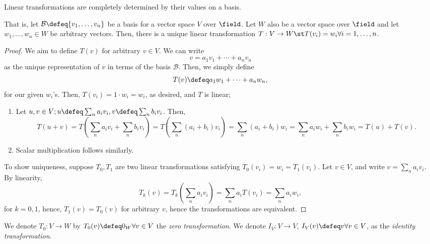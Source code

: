 \begin{theorem}\label{thm:basisdeteremineslineartransformation}
    Linear transformations are completely determined by their values on a basis. 
    
    That is, let $\mathcal{B} \defeq \{v_1, \dots, v_n\}$ be a basis for a vector space $V$ over $\field$. Let $W$ also be a vector space over $\field$ and let $w_1, \dots, w_n \in W$ be arbitrary vectors. Then, there is a unique linear transformation $T : V \to W \st T(v_i) = w_i \forall i = 1, \dots, n$.
\end{theorem}

\begin{proof}
    We aim to define $T(v)$ for arbitrary $v \in V$. We can write \[
    v = a_1 v_1 + \cdots + a_n v_n    
    \]
    as the unique representation of $v$ in terms of the basis $\mathcal{B}$. Then, we simply define \[
        T(v) \defeq a_1 w_1 + \cdots + a_n w_n,
    \]
    for our given $w_i$'s. Then, $T(v_i) = 1 \cdot w_i = w_i$, as desired, and $T$ is linear; \begin{enumerate}
        \item Let $u, v \in V; u \defeq \sum_{n} a_i v_i, v\defeq \sum_{n} b_i v_i$. Then, \[
        T(u + v) = T(\sum_{n} a_i v_i+\sum_{n} b_i v_i) = T(\sum_n(a_i + b_i) v_i)   =\sum_n (a_i + b_i) w_i =  \sum_{n} a_i w_i + \sum_{n} b_i w_i = T(u) + T(v).
        \]
        \item Scalar multiplication follows similarly.
    \end{enumerate}

    To show uniqueness, suppose $T_0, T_1$ are two linear transformations satisfying $T_0(v_i) = w_i = T_1(v_i)$. Let $v \in V$, and write $v = \sum_{n} a_i v_i$. By linearity, \[
    T_k (v) = T_k(\sum_n a_i v_i) = \sum_n a_i T(v_i) = \sum_n a_i w_i,    
    \]
    for $k = 0, 1$, hence, $T_1(v) = T_0(v)$ for arbitrary $v$, hence the transformations are equivalent.
\end{proof}

\begin{definition}
    We denote $T_0: V \to W$ by $T_0(v) \defeq 0_W \forall v \in V$ the \emph{zero transformation}. We denote $I_V : V \to V$, $I_V(v) \defeq v \forall v \in V$, as the \emph{identity transformation}.
\end{definition}